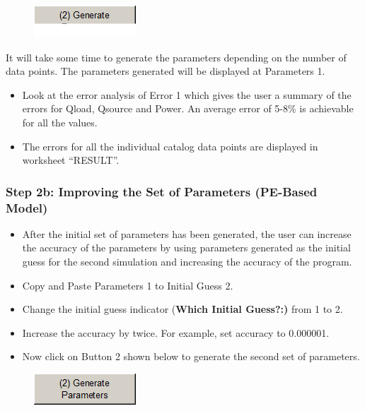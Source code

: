 \begin{figure}[htbp]
\centering
\includegraphics{media/image040.png}
\caption{}
\end{figure}

It will take some time to generate the parameters depending on the number of data points. The parameters generated will be displayed at Parameters 1.

\begin{itemize}
\item
  Look at the error analysis of Error 1 which gives the user a summary of the errors for Qload, Qsource and Power. An average error of 5-8\% is achievable for all the values.
\item
  The errors for all the individual catalog data points are displayed in worksheet ``RESULT''.
\end{itemize}

\subsubsection{Step 2b: Improving the Set of Parameters (PE-Based Model)}\label{step-2b-improving-the-set-of-parameters-pe-based-model-001}

\begin{itemize}
\item
  After the initial set of parameters has been generated, the user can increase the accuracy of the parameters by using parameters generated as the initial guess for the second simulation and increasing the accuracy of the program.
\item
  Copy and Paste Parameters 1 to Initial Guess 2.
\item
  Change the initial guess indicator (\textbf{Which Initial Guess?:)} from 1 to 2.
\item
  Increase the accuracy by twice. For example, set accuracy to 0.000001.
\item
  Now click on Button 2 shown below to generate the second set of parameters.
\end{itemize}

\begin{figure}[htbp]
\centering
\includegraphics{media/image041.png}
\caption{}
\end{figure}

